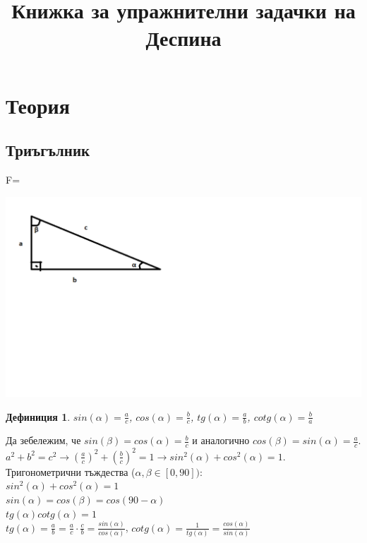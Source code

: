 \documentclass{article}
\date{}
\title{Книжка за упражнителни задачки на Деспина}
\newtheorem{definition}{Дефиниция}
\begin{document}
	
	
	\maketitle
	\tableofcontents
	
	\section{Теория}
	
	\subsection{Триъгълник}
	
	
	

	
F=
	
	
	
	\includegraphics{Trig1}
	
	\vspace{-8cm}
	
	\begin{definition}$ sin(\alpha) = \frac{a}{c} $, $ cos(\alpha) = \frac{b}{c} $, $tg(\alpha) = \frac{a}{b} $, $cotg(\alpha) = \frac{b}{a} $	
	\end{definition}
Да зебележим, че $ sin(\beta) = cos(\alpha) = \frac{b}{c} $ и аналогично $cos(\beta) = sin(\alpha ) = \frac{a}{c} $.
$a^2 + b^2 = c^2  \to (\frac{a}{c})^2 + (\frac{b}{c})^2 = 1 \to sin^2(\alpha) + cos^2(\alpha) = 1$. \\
Тригонометрични тъждества ($\alpha, \beta \in [0,90] )$: \\
$sin^2(\alpha) + cos^2(\alpha) = 1$ \\
$ sin(\alpha) = cos(\beta) = cos(90 - \alpha) $ \\
$ tg(\alpha)cotg(\alpha) = 1 $ \\
$ tg(\alpha) = \frac{a}{b} = \frac{a}{c} \cdot \frac{c}{b} = \frac{sin(\alpha)}{cos(\alpha)} $, $cotg(\alpha) = \frac{1}{tg(\alpha)} = \frac{cos(\alpha)}{sin(\alpha)} $ 
\end{document}
